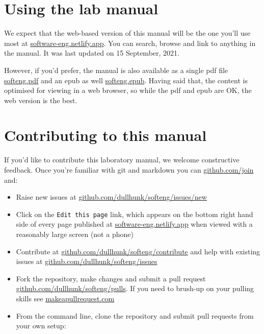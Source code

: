\documentclass[
]{book}
\providecommand{\tightlist}{%
  \setlength{\itemsep}{0pt}\setlength{\parskip}{0pt}}
\begin{document}
\hypertarget{usingit}{%
\section{Using the lab manual}\label{usingit}}

We expect that the web-based version of this manual will be the one you'll use most at \href{https://software-eng.netlify.app/}{software-eng.netlify.app}. You can search, browse and link to anything in the manual. It was last updated on 15 September, 2021.

However, if you'd prefer, the manual is also available as a single pdf file \href{https://software-eng.netlify.app/softeng.pdf}{softeng.pdf} and an epub as well \href{https://software-eng.netlify.app/softeng.epub}{softeng.epub}. Having said that, the content is optimised for viewing in a web browser, so while the pdf and epub are OK, the web version is the best.

\hypertarget{contributing}{%
\section{Contributing to this manual}\label{contributing}}

If you'd like to contribute this laboratory manual, we welcome constructive feedback. Once you're familiar with git and markdown you can \href{https://github.com/join}{github.com/join} and:

\begin{itemize}
\tightlist
\item
  Raise new issues at \href{https://github.com/dullhunk/softeng/issues/new}{github.com/dullhunk/softeng/issues/new}
\item
  Click on the \texttt{Edit\ this\ page} link, which appears on the bottom right hand side of every page published at \href{https://software-eng.netlify.app}{software-eng.netlify.app} when viewed with a reasonably large screen (not a phone)
\item
  Contribute at \href{https://github.com/dullhunk/softeng/contribute}{github.com/dullhunk/softeng/contribute} and help with existing issues at \href{https://github.com/dullhunk/softeng/issues}{github.com/dullhunk/softeng/issues}
\item
  Fork the repository, make changes and submit a pull request \href{https://github.com/dullhunk/softeng/pulls}{github.com/dullhunk/softeng/pulls}. If you need to brush-up on your pulling skills see \href{http://makeapullrequest.com/}{makeapullrequest.com}
\item
  From the command line, clone the repository and submit pull requests from your own setup:
\end{itemize}
\end{document}
